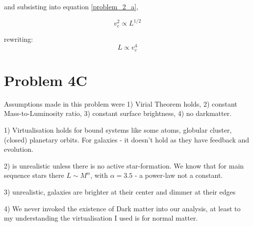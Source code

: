 and subsisting into equation \ref{problem_2_a},

\begin{equation}
    v_c^2 \propto L^{1/2}
\end{equation}

rewriting:
\begin{equation}
    \boxed{L \propto v_c^4}
\end{equation}


\section*{Problem 4C}
Assumptions made in this problem were 1) Virial Theorem holds, 2) constant Mass-to-Luminosity ratio, 3) constant surface brightness, 4) no darkmatter.


1) Virtualisation holds for bound systems like some atoms, globular cluster, (closed) planetary orbits. For galaxies - it doesn't hold as they have feedback and evolution. 

2) is unrealistic unless there is no active star-formation. We know that for main sequence stars there $L \sim M^\alpha$, with $\alpha = 3.5$ - a power-law not a constant. 

3) unrealistic, galaxies are brighter at their center and dimmer at their edges

4) We never invoked the existence of Dark matter into our analysis, at least to my understanding the virtualisation I used is for normal matter.  

